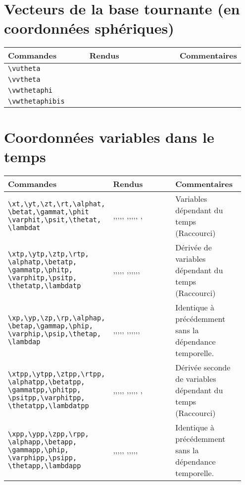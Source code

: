 \documentclass[a4paper,10pt]{article}
\newcommand{\rac}{({\color{red}Raccourci})}
\begin{document}
	\section{Vecteurs de la base tournante (en coordonnées sphériques)}
	\begin{tabular}{|p{0.35\linewidth}|p{0.4\linewidth}|p{0.2\linewidth}|}
		\hline
			\textbf{Commandes}&\textbf{Rendus}&\textbf{Commentaires}
		\\\hline\hline
			\verb!\vutheta!	&	\vutheta	&
		\\\hline
			\verb!\vvtheta!	&	\vvtheta	&
		\\\hline
			\verb!\vwthetaphi!	&	\vwthetaphi	&
		\\\hline
			\verb!\vwthetaphibis!	&	\vwthetaphibis	&
		\\\hline
	\end{tabular}

	\section{Coordonnées variables dans le temps}
	\noindent
	\begin{tabular}{|p{0.35\linewidth}|p{0.3\linewidth}|p{0.3\linewidth}|}
		\hline
			\textbf{Commandes}&\textbf{Rendus}&\textbf{Commentaires}
		\\\hline\hline
			\verb!\xt,\yt,\zt,\rt,\alphat,! \verb!\betat,\gammat,\phit! \verb!\varphit,\psit,\thetat,! \verb!\lambdat!	&	\xt,\yt,\zt,\rt,\alphat, \betat,\gammat,\phit,\varphit,\psit, \thetat,\lambdat	&	Variables dépendant du temps \rac
		\\\hline
			\verb!\xtp,\ytp,\ztp,\rtp,! \verb!\alphatp,\betatp,! \verb!\gammatp,\phitp,! \verb!\varphitp,\psitp,! \verb!\thetatp,\lambdatp!	&	\xtp,\ytp,\ztp,\rtp,\alphatp, \betatp,\gammatp,\phitp,\varphitp,\psitp,\thetatp,\lambdatp	&	Dérivée de variables dépendant du temps \rac
		\\\hline
			\verb!\xp,\yp,\zp,\rp,\alphap,! \verb!\betap,\gammap,\phip,! \verb!\varphip,\psip,\thetap,! \verb!\lambdap!	&	\xp,\yp,\zp,\rp,\alphap, \betap,\gammap,\phip,\varphip,\psip,\thetap,\lambdap	&	Identique à précédemment sans la dépendance temporelle.
		\\\hline
			\verb!\xtpp,\ytpp,\ztpp,\rtpp,! \verb!\alphatpp,\betatpp,! \verb!\gammatpp,\phitpp,! \verb!\psitpp,\varphitpp,! \verb!\thetatpp,\lambdatpp!	&	\xtpp,\ytpp,\ztpp,\rtpp,\alphatpp, \betatpp,\gammatpp,\phitpp,\varphitpp,\psitpp, \thetatpp,\lambdatpp	&	Dérivée seconde de variables dépendant du temps \rac
		\\\hline
			\verb!\xpp,\ypp,\zpp,\rpp,! \verb!\alphapp,\betapp,! \verb!\gammapp,\phip,! \verb!\varphipp,\psipp,! \verb!\thetapp,\lambdapp!	&	\xpp,\ypp,\zpp,\rpp,\alphapp, \betapp,\gammapp,\phipp,\varphipp\psipp,\thetapp,\lambdapp	&	Identique à précédemment sans la dépendance temporelle.
		\\\hline
	\end{tabular}
\end{document}
